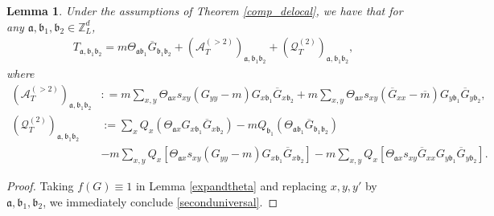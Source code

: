 \documentclass{article}
\newcommand{\1}{\mathds{1}}
\numberwithin{equation}{section}
\newcommand{\al}{\alpha}
\newcommand{\be}{\begin{equation}}
\newcommand{\ee}{\end{equation}}
\newcommand{\fa}{{\mathfrak a}}
\newcommand{\fb}{{\mathfrak b}}
\newcommand{\Z}{\mathbb{Z}}
\DeclareMathOperator{\OO}{O}
\theoremstyle{plain} %
\newtheorem{lemma}[theorem]{Lemma}
\theoremstyle{remark}
\newcommand{\Sdelta}{{\Sigma}_T}
\newcommand{\PT}{\mathcal R_T}
\newcommand{\QT}{\mathcal Q_T}
\newcommand{\AT}{\mathcal A_T}
\begin{document}
\begin{lemma}\label{2nd3rd T}
Under the assumptions of Theorem \ref{comp_delocal}, we have that for any $\fa, \fb_1,\fb_2 \in \Z_L^d$, 
\begin{align}\label{seconduniversal}
& T_{\fa,\fb_1\fb_2}= %
m \Theta_{\fa\fb_1} \overline G_{\fb_1\fb_2}    + (\AT^{(>2)})_{\fa,\fb_1\fb_2} + (\QT^{(2)})_{\fa,\fb_1\fb_2}  ,
 \end{align}
 where %
 \begin{align}
  (\AT^{(>2)})_{\fa,\fb_1\fb_2}& :  =  m\sum_{x,y} \Theta_{\fa x} s_{xy} (G_{yy}-m) G_{x \fb_1}\overline G_{x \fb_2}  + m \sum_{x,y} \Theta_{\fa x} s_{xy}  ( \overline G_{xx} - \overline m) G_{y \fb_1}\overline G_{y \fb_2}, \label{Aho>2}  \\
    (\QT^{(2)})_{\fa,\fb_1\fb_2}& := \sum_x Q_x\left(\Theta_{\fa x} G_{x \fb_1}   \overline G_{x \fb_2} \right) - m Q_{\fb_1} \left( \Theta_{\fa\fb_1} \overline G_{\fb_1 \fb_2}\right)  \nonumber\\
    & -  m\sum_{x,y} Q_x\left[\Theta_{\fa x} s_{xy} (G_{yy}-m) G_{x \fb_1} \overline G_{x \fb_2} \right] - m \sum_{x,y} Q_x\left[ \Theta_{\fa x} s_{xy}  \overline G_{xx} G_{y\fb_1}\overline G_{y\fb_2} \right] .\label{QT>2}
 \end{align}
\end{lemma}

 \begin{proof}%
 Taking $f(G)\equiv 1$ in Lemma \ref{expandtheta} and replacing $x,y,y'$ by $\fa, \fb_1,\fb_2$, we immediately conclude \eqref{seconduniversal}.
\end{proof}
 
\end{document}
